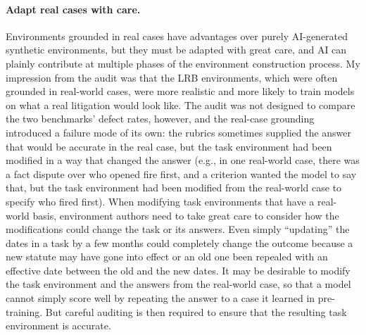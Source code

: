 \documentclass[11pt]{article}
\begin{document}
\paragraph{Adapt real cases with care.} Environments grounded in real cases have advantages over purely AI-generated synthetic environments, but they must be adapted with great care, and AI can plainly contribute at multiple phases of the environment construction process. My impression from the audit was that the LRB environments, which were often grounded in real-world cases, were more realistic and more likely to train models on what a real litigation would look like. The audit was not designed to compare the two benchmarks' defect rates, however, and the real-case grounding introduced a failure mode of its own: the rubrics sometimes supplied the answer that would be accurate in the real case, but the task environment had been modified in a way that changed the answer (e.g., in one real-world case, there was a fact dispute over who opened fire first, and a criterion wanted the model to say that, but the task environment had been modified from the real-world case to specify who fired first). When modifying task environments that have a real-world basis, environment authors need to take great care to consider how the modifications could change the task or its answers. Even simply ``updating'' the dates in a task by a few months could completely change the outcome because a new statute may have gone into effect or an old one been repealed with an effective date between the old and the new dates. It may be desirable to modify the task environment and the answers from the real-world case, so that a model cannot simply score well by repeating the answer to a case it learned in pre-training. But careful auditing is then required to ensure that the resulting task environment is accurate.
\end{document}
